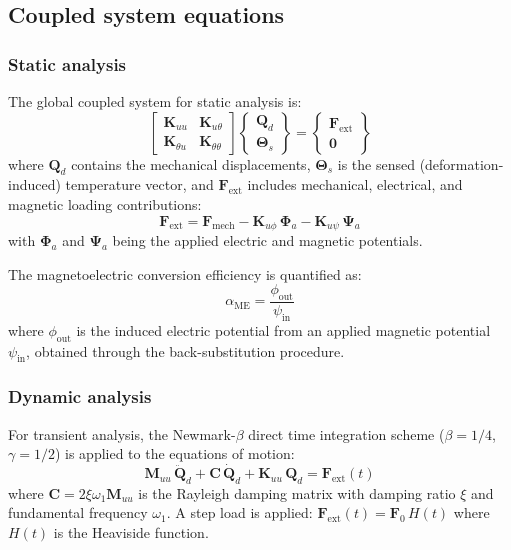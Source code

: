 \documentclass[11pt,a4paper]{article}
\begin{document}
\subsection{Coupled system equations}

\subsubsection{Static analysis}

The global coupled system for static analysis is:
\begin{equation}
\begin{bmatrix}
\bm{K}_{uu} & \bm{K}_{u\theta} \\
\bm{K}_{\theta u} & \bm{K}_{\theta\theta}
\end{bmatrix}
\begin{Bmatrix}
\bm{Q}_d \\ \bm{\Theta}_s
\end{Bmatrix}
=
\begin{Bmatrix}
\bm{F}_{\text{ext}} \\ \bm{0}
\end{Bmatrix}
\label{eq:static-system}
\end{equation}
where $\bm{Q}_d$ contains the mechanical displacements, $\bm{\Theta}_s$ is the sensed (deformation-induced) temperature vector, and $\bm{F}_{\text{ext}}$ includes mechanical, electrical, and magnetic loading contributions:
\begin{equation}
\bm{F}_{\text{ext}} = \bm{F}_{\text{mech}} - \bm{K}_{u\phi}\,\bm{\Phi}_a - \bm{K}_{u\psi}\,\bm{\Psi}_a
\end{equation}
with $\bm{\Phi}_a$ and $\bm{\Psi}_a$ being the applied electric and magnetic potentials.

The magnetoelectric conversion efficiency is quantified as:
\begin{equation}
\alpha_{\text{ME}} = \frac{\phi_{\text{out}}}{\psi_{\text{in}}}
\end{equation}
where $\phi_{\text{out}}$ is the induced electric potential from an applied magnetic potential $\psi_{\text{in}}$, obtained through the back-substitution procedure.

\subsubsection{Dynamic analysis}

For transient analysis, the Newmark-$\beta$ direct time integration scheme ($\beta = 1/4$, $\gamma = 1/2$) is applied to the equations of motion:
\begin{equation}
\bm{M}_{uu}\,\ddot{\bm{Q}}_d + \bm{C}\,\dot{\bm{Q}}_d + \bm{K}_{uu}\,\bm{Q}_d = \bm{F}_{\text{ext}}(t)
\label{eq:newmark}
\end{equation}
where $\bm{C} = 2\xi\omega_1\bm{M}_{uu}$ is the Rayleigh damping matrix with damping ratio $\xi$ and fundamental frequency $\omega_1$. A step load is applied: $\bm{F}_{\text{ext}}(t) = \bm{F}_0\,H(t)$ where $H(t)$ is the Heaviside function.
\end{document}
